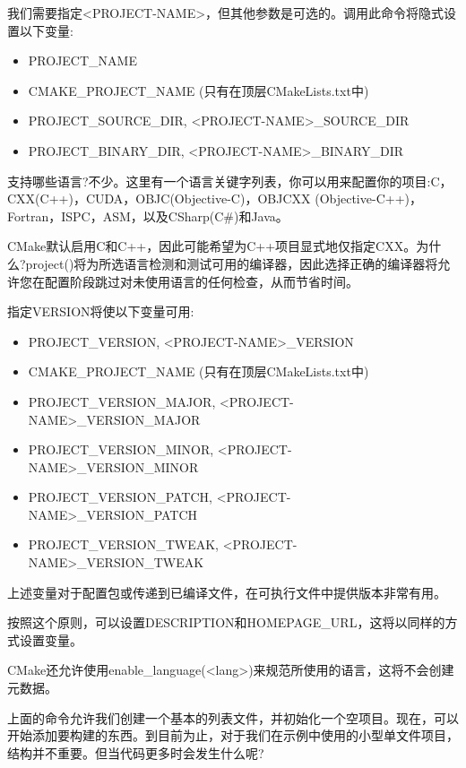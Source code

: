 我们需要指定<PROJECT-NAME>，但其他参数是可选的。调用此命令将隐式设置以下变量:

\begin{itemize}
\item 
PROJECT\_NAME

\item 
CMAKE\_PROJECT\_NAME (只有在顶层CMakeLists.txt中)

\item 
PROJECT\_SOURCE\_DIR, <PROJECT-NAME>\_SOURCE\_DIR

\item 
PROJECT\_BINARY\_DIR, <PROJECT-NAME>\_BINARY\_DIR
\end{itemize}

支持哪些语言?不少。这里有一个语言关键字列表，你可以用来配置你的项目:C，CXX(C++)，CUDA，OBJC(Objective-C)，OBJCXX (Objective-C++)，Fortran，ISPC，ASM，以及CSharp(C\#)和Java。

CMake默认启用C和C++，因此可能希望为C++项目显式地仅指定CXX。为什么?project()将为所选语言检测和测试可用的编译器，因此选择正确的编译器将允许您在配置阶段跳过对未使用语言的任何检查，从而节省时间。

指定VERSION将使以下变量可用:

\begin{itemize}
\item 
PROJECT\_VERSION, <PROJECT-NAME>\_VERSION

\item 
CMAKE\_PROJECT\_NAME (只有在顶层CMakeLists.txt中)

\item 
PROJECT\_VERSION\_MAJOR, <PROJECT-NAME>\_VERSION\_MAJOR

\item 
PROJECT\_VERSION\_MINOR, <PROJECT-NAME>\_VERSION\_MINOR

\item 
PROJECT\_VERSION\_PATCH, <PROJECT-NAME>\_VERSION\_PATCH

\item 
PROJECT\_VERSION\_TWEAK, <PROJECT-NAME>\_VERSION\_TWEAK
\end{itemize}


上述变量对于配置包或传递到已编译文件，在可执行文件中提供版本非常有用。

按照这个原则，可以设置DESCRIPTION和HOMEPAGE\_URL，这将以同样的方式设置变量。

CMake还允许使用enable\_language(<lang>)来规范所使用的语言，这将不会创建元数据。

上面的命令允许我们创建一个基本的列表文件，并初始化一个空项目。现在，可以开始添加要构建的东西。到目前为止，对于我们在示例中使用的小型单文件项目，结构并不重要。但当代码更多时会发生什么呢?



